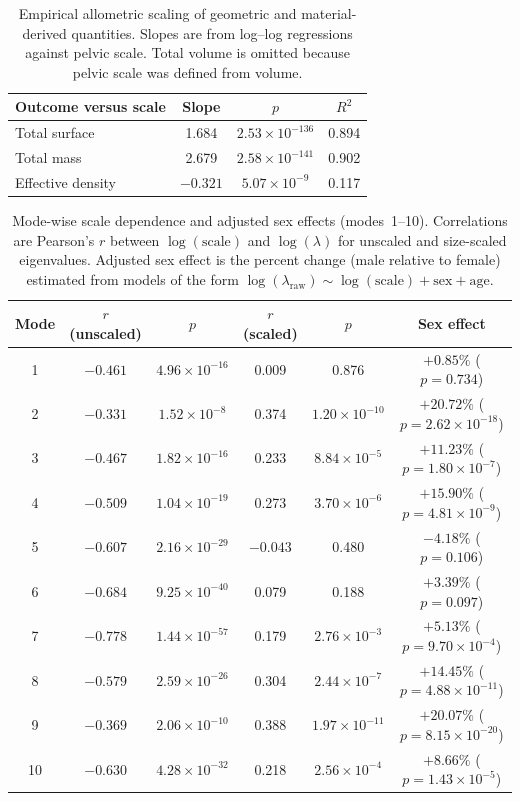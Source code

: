\documentclass[openacc]{rsproca_new}
\begin{document}
\begin{table}[p]
\centering
\caption{Empirical allometric scaling of geometric and material-derived quantities. Slopes are from log--log regressions against pelvic scale. Total volume is omitted because pelvic scale was defined from volume.}
\label{tab:allometry}
\begin{tabular}{lccc}
\toprule
Outcome versus scale & Slope & $p$ & $R^2$ \\
\midrule
Total surface & 1.684 & $2.53 \times 10^{-136}$ & 0.894 \\
Total mass & 2.679 & $2.58 \times 10^{-141}$ & 0.902 \\
Effective density & $-0.321$ & $5.07 \times 10^{-9}$ & 0.117 \\
\bottomrule
\end{tabular}
\end{table}

\begin{table}[p]
\centering
\caption{Mode-wise scale dependence and adjusted sex effects (modes~1--10). Correlations are Pearson's $r$ between $\log(\mathrm{scale})$ and $\log(\lambda)$ for unscaled and size-scaled eigenvalues. Adjusted sex effect is the percent change (male relative to female) estimated from models of the form $\log(\lambda_{\mathrm{raw}}) \sim \log(\mathrm{scale}) + \mathrm{sex} + \mathrm{age}$.}
\label{tab:modes}
\begin{tabular}{cccccc}
\toprule
Mode & $r$ (unscaled) & $p$ & $r$ (scaled) & $p$ & Sex effect \\
\midrule
1  & $-0.461$ & $4.96 \times 10^{-16}$ & 0.009 & 0.876 & $+0.85\%$ ($p=0.734$) \\
2  & $-0.331$ & $1.52 \times 10^{-8}$  & 0.374 & $1.20 \times 10^{-10}$ & $+20.72\%$ ($p=2.62 \times 10^{-18}$) \\
3  & $-0.467$ & $1.82 \times 10^{-16}$ & 0.233 & $8.84 \times 10^{-5}$  & $+11.23\%$ ($p=1.80 \times 10^{-7}$) \\
4  & $-0.509$ & $1.04 \times 10^{-19}$ & 0.273 & $3.70 \times 10^{-6}$  & $+15.90\%$ ($p=4.81 \times 10^{-9}$) \\
5  & $-0.607$ & $2.16 \times 10^{-29}$ & $-0.043$ & 0.480 & $-4.18\%$ ($p=0.106$) \\
6  & $-0.684$ & $9.25 \times 10^{-40}$ & 0.079 & 0.188 & $+3.39\%$ ($p=0.097$) \\
7  & $-0.778$ & $1.44 \times 10^{-57}$ & 0.179 & $2.76 \times 10^{-3}$  & $+5.13\%$ ($p=9.70 \times 10^{-4}$) \\
8  & $-0.579$ & $2.59 \times 10^{-26}$ & 0.304 & $2.44 \times 10^{-7}$  & $+14.45\%$ ($p=4.88 \times 10^{-11}$) \\
9  & $-0.369$ & $2.06 \times 10^{-10}$ & 0.388 & $1.97 \times 10^{-11}$ & $+20.07\%$ ($p=8.15 \times 10^{-20}$) \\
10 & $-0.630$ & $4.28 \times 10^{-32}$ & 0.218 & $2.56 \times 10^{-4}$  & $+8.66\%$ ($p=1.43 \times 10^{-5}$) \\
\bottomrule
\end{tabular}
\end{table}
\end{document}
